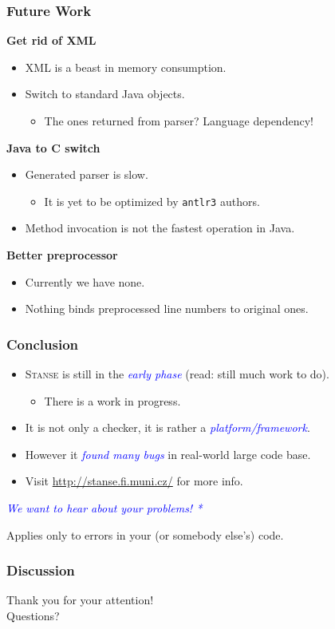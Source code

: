 \documentclass[handout,xcolor=dvipsnames]{beamer}
\let\Oldemph\emph
\renewcommand{\emph}[1]{\textcolor{blue}{\Oldemph{#1}}}
\newcommand{\heading}[1]{\textbf{\textcolor{BurntOrange}{#1}}}
\begin{document}
\begin{frame}
  \frametitle{Future Work}
  \heading{Get rid of XML}
  \begin{itemize}
  \item XML is a beast in memory consumption.
  \item Switch to standard Java objects.
    \begin{itemize}
    \item The ones returned from parser? Language dependency!
    \end{itemize}
  \end{itemize}

  \pause
  \medskip

  \heading{Java to C switch}
  \begin{itemize}
  \item Generated parser is slow.
    \begin{itemize}
    \item It is yet to be optimized by \texttt{antlr3} authors.
    \end{itemize}
  \item Method invocation is not the fastest operation in Java.
  \end{itemize}

  \pause
  \medskip

  \heading{Better preprocessor}
  \begin{itemize}
  \item Currently we have none.
  \item Nothing binds preprocessed line numbers to original ones.
  \end{itemize}

\end{frame}

\begin{frame}
  \frametitle{Conclusion}
  \begin{itemize}
  \item \textsc{Stanse} is still in the \emph{early phase} (read: still much
    work to do).
    \begin{itemize}
    \item There is a work in progress.
    \end{itemize}
  \item It is not only a checker, it is rather a \emph{platform/framework}.
  \item However it \emph{found many bugs} in real-world large code base.
  \item Visit \url{http://stanse.fi.muni.cz/} for more info.
  \end{itemize}

  \pause
  \vfill
  \begin{center}
    \emph{We want to hear about your problems! *}
  \end{center}

  \vfill
  {\tiny * Applies only to errors in your (or somebody else's) code.}
\end{frame}

\begin{frame}
  \frametitle{Discussion}
  \begin{center} \huge
  Thank you for your attention! \\[2.4em]
  Questions?
  \end{center}
\end{frame}
\end{document}
